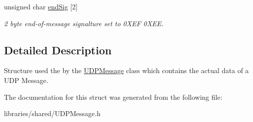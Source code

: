 \begin{DoxyCompactItemize}
\mbox{\label{struct_u_d_p_message_struct_a68c8ce1a9f79ecb4b3955eaf98a4781c}} 
unsigned char \hyperlink{struct_u_d_p_message_struct_a68c8ce1a9f79ecb4b3955eaf98a4781c}{end\+Sig} \mbox{[}2\mbox{]}
\begin{DoxyCompactList}\small\item\em 2 byte end-\/of-\/message signalture set to 0\+X\+EF 0\+X\+EE. \end{DoxyCompactList}\end{DoxyCompactItemize}


\subsection{Detailed Description}
Structure used the by the \hyperlink{class_u_d_p_message}{U\+D\+P\+Message} class which contains the actual data of a U\+DP Message. 

The documentation for this struct was generated from the following file\+:\begin{DoxyCompactItemize}
\item 
libraries/shared/U\+D\+P\+Message.\+h\end{DoxyCompactItemize}
